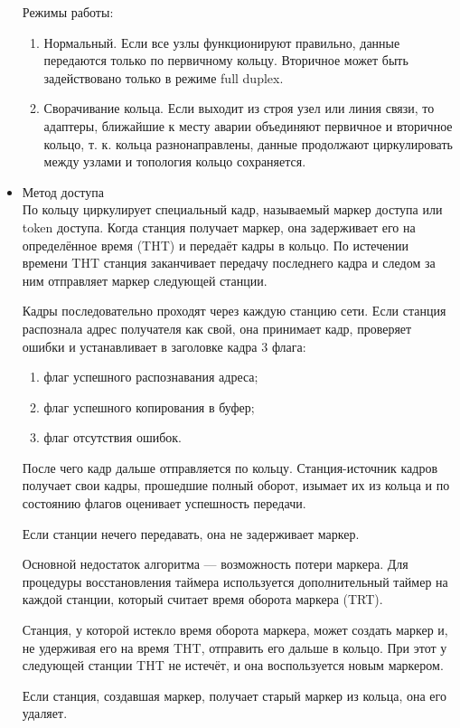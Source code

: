 \documentclass[12pt, russian, oneside, article]{ncc}
\begin{document}
\begin{itemize}
Режимы работы:
\begin{enumerate}
\item Нормальный. Если все узлы функционируют правильно, данные передаются только по первичному кольцу. Вторичное может быть задействовано только в режиме full duplex.
\item Сворачивание кольца. Если выходит из строя узел или линия связи, то адаптеры, ближайшие к месту аварии объединяют первичное и вторичное кольцо, т. к. кольца разнонаправлены, данные продолжают циркулировать между узлами и топология кольцо сохраняется.
\end{enumerate}


\item Метод доступа\\
\label{sec-5_2_2_2}%
По кольцу циркулирует специальный кадр, называемый маркер доступа или token доступа. Когда станция получает маркер, она задерживает его на определённое время (THT) и передаёт кадры в кольцо. По истечении времени THT станция заканчивает передачу последнего кадра и следом за ним отправляет маркер следующей станции.

Кадры последовательно проходят через каждую станцию сети. Если станция распознала адрес получателя как свой, она принимает кадр, проверяет ошибки и устанавливает в заголовке кадра 3 флага:
\begin{enumerate}
\item флаг успешного распознавания адреса;
\item флаг успешного копирования в буфер;
\item флаг отсутствия ошибок.
\end{enumerate}

После чего кадр дальше отправляется по кольцу. Станция-источник кадров получает свои кадры, прошедшие полный оборот, изымает их из кольца и по состоянию флагов оценивает успешность передачи.

Если станции нечего передавать, она не задерживает маркер.

Основной недостаток алгоритма --- возможность потери маркера. Для процедуры восстановления таймера используется дополнительный таймер на каждой станции, который считает время оборота маркера (TRT). 

Станция, у которой истекло время оборота маркера, может создать маркер и, не удерживая его на время THT, отправить его дальше в кольцо. При этот у следующей станции THT не истечёт, и она воспользуется новым маркером.

Если станция, создавшая маркер, получает старый маркер из кольца, она его удаляет.



\end{itemize}
\end{document}
